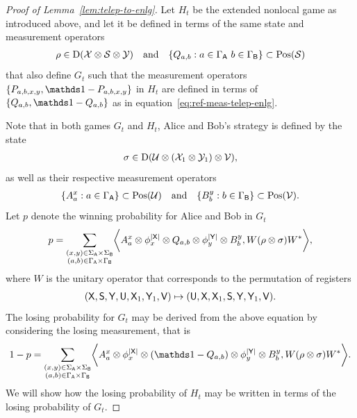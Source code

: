 \begin{proof}[Proof of Lemma~\ref{lem:telep-to-enlg}]
Let $H_t$ be the extended nonlocal game as introduced above, and let it be defined in terms of the same state and measurement operators
	\begin{align}
		\rho \in \mathrm{D}(\mathcal{X} \otimes \mathcal{S} \otimes \mathcal{Y}) \quad \textnormal{and} \quad \{Q_{a,b} : a \in \Gamma_{\mathsf{A}} \ b \in \Gamma_{\mathsf{B}}\} \subset \mathrm{Pos}(\mathcal{S})
	\end{align}
that also define $G_{t}$ such that the measurement operators $\{P_{a,b,x,y}, \I - P_{a,b,x,y}\}$ in $H_t$ are defined in terms of $\{Q_{a,b}, \I - Q_{a,b} \}$ as in equation~\eqref{eq:ref-meas-telep-enlg}. 

Note that in both games $G_t$ and $H_t$, Alice and Bob's strategy is defined by the state
\begin{align}
	\sigma \in \mathrm{D}(\mathcal{U} \otimes (\mathcal{X}_1 \otimes \mathcal{Y}_1) \otimes \mathcal{V}), \end{align}
as well as their respective measurement operators 
\begin{align}
	\{A_a^x : a \in \Gamma_{\mathsf{A}} \} \subset \mathrm{Pos}(\mathcal{U}) \quad \textnormal{and} \quad  \{B_b^y : b \in \Gamma_{\mathsf{B}} \} \subset \mathrm{Pos}(\mathcal{V}).
\end{align}
Let $p$ denote the winning probability for Alice and Bob in $G_t$
\begin{align}
	p = \sum_{\substack{(x,y) \in \Sigma_{\mathsf{A}} \times \Sigma_{\mathsf{B}} \\ (a,b) \in \Gamma_{\mathsf{A}} \times \Gamma_{\mathsf{B}}}} \biggl\langle  A_a^x \otimes \phi_x^{\left\lvert \mathsf{X} \right\rvert} \otimes Q_{a,b} \otimes \phi_y^{\left\lvert \mathsf{Y} \right\rvert} \otimes B_b^y ,  W (\rho \otimes \sigma) W^*  \biggr\rangle,
\end{align}
where $W$ is the unitary operator that corresponds to the permutation of registers 
\begin{align}
	(\mathsf{X},\mathsf{S},\mathsf{Y},\mathsf{U},\mathsf{X}_1,\mathsf{Y}_1,\mathsf{V}) \mapsto (\mathsf{U},\mathsf{X},\mathsf{X}_1,\mathsf{S},\mathsf{Y},\mathsf{Y}_1,\mathsf{V}).
\end{align}
The losing probability for $G_t$ may be derived from the above equation by considering the losing measurement, that is
\begin{align} \label{eq:telep-losing-prob}
	1 - p = \sum_{\substack{(x,y) \in \SigmaA \times \SigmaB \\ (a,b) \in \GammaA \times \GammaB}} \biggip{ A_a^x \otimes \phi_x^{\abs{\reg{X}}} \otimes (\I - Q_{a,b}) \otimes \phi_y^{\abs{\reg{Y}}} \otimes B_b^y }{ W (\rho \otimes \sigma) W^* }.
\end{align}
We will show how the losing probability of $H_t$ may be written in terms of the losing probability of $G_t$. 


\end{proof}
